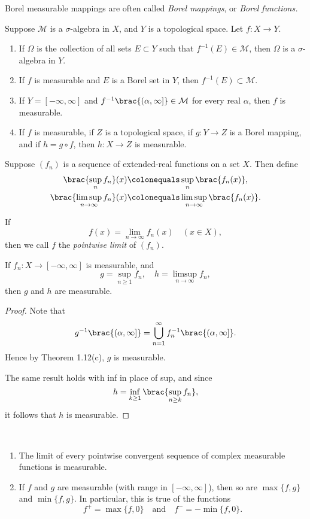Borel measurable mappings are often called \emph{Borel mappings}, or \emph{Borel functions.} 

\begin{proposition}
Suppose $\mathcal{M}$ is a $\sigma$-algebra in $X$, and $Y$ is a topological space. Let $f\colon X\to Y$.
\begin{enumerate}[label=(\roman*)]
\item If $\Omega$ is the collection of all sets $E\subset Y$ such that $f^{-1}(E)\in\mathcal{M}$, then $\Omega$ is a $\sigma$-algebra in $Y$.
\item If $f$ is measurable and $E$ is a Borel set in $Y$, then $f^{-1}(E)\subset\mathcal{M}$.
\item If $Y=[-\infty,\infty]$ and $f^{-1}\brac{(\alpha,\infty]}\in\mathcal{M}$ for every real $\alpha$, then $f$ is measurable.
\item If $f$ is measurable, if $Z$ is a topological space, if $g\colon Y\to Z$ is a Borel mapping, and if $h=g\circ f$, then $h\colon X\to Z$ is measurable.
\end{enumerate}
\end{proposition}

Suppose $(f_n)$ is a sequence of extended-real functions on a set $X$. 
Then define
\begin{align*}
\brac{\sup_{n}f_n}(x)&\colonequals\sup_{n}\brac{f_n(x)},\\
\brac{\limsup_{n\to\infty}f_n}(x)&\colonequals\limsup_{n\to\infty}\brac{f_n(x)}.
\end{align*}

If
\[f(x)=\lim_{n\to\infty}f_n(x)\quad(x\in X),\]
then we call $f$ the \emph{pointwise limit} of $(f_n)$.

\begin{proposition}
If $f_n:X\to[-\infty,\infty]$ is measurable, and
\[g=\sup_{n\ge1}f_n,\quad h=\limsup_{n\to\infty}f_n,\]
then $g$ and $h$ are measurable.
\end{proposition}

\begin{proof}
Note that
\[g^{-1}\brac{(\alpha,\infty]}=\bigcup_{n=1}^{\infty}f_n^{-1}\brac{(\alpha,\infty]}.\]
Hence by Theorem 1.12(c), $g$ is measurable. 

The same result holds with inf in place of sup, and since
\[h=\inf_{k\ge1}\brac{\sup_{n\ge k}f_n},\]
it follows that $h$ is measurable.
\end{proof}

\begin{corollary} \
\begin{enumerate}[label=(\roman*)]
\item The limit of every pointwise convergent sequence of complex measurable functions is measurable.
\item If $f$ and $g$ are measurable (with range in $[-\infty,\infty]$), then so are $\max\{f,g\}$ and $\min\{f,g\}$. In particular, this is true of the functions
\[f^+=\max\{f,0\}\quad\text{and}\quad f^-=-\min\{f,0\}.\] 
\end{enumerate}
\end{corollary}

